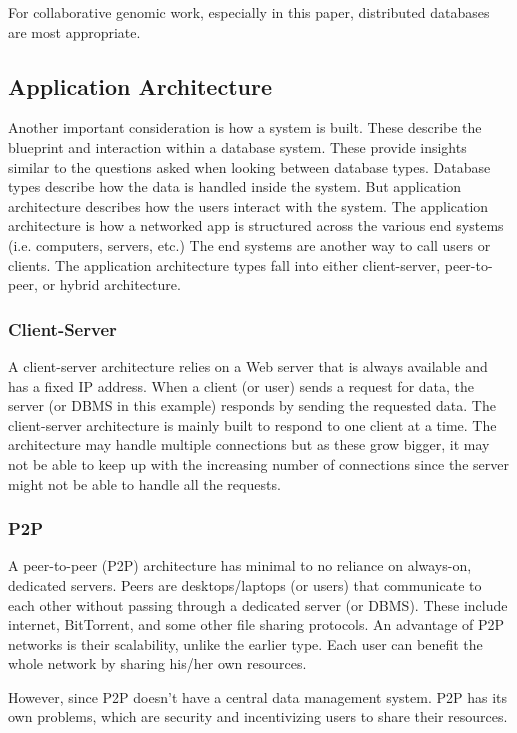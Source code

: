 \documentclass{article}
\begin{document}
For collaborative genomic work, especially in this paper, distributed databases are most appropriate.

\subsection{Application Architecture}
Another important consideration is how a system is built. These describe the blueprint and interaction within a database system. These provide insights similar to the questions asked when looking between database types. Database types describe how the data is handled inside the system. But application architecture describes how the users interact with the system. The application architecture is how a networked app is structured across the various end systems (i.e. computers, servers, etc.) \autocite{kurose} The end systems are another way to call users or clients. 
The application architecture types fall into either client-server, peer-to-peer, or hybrid architecture.

\subsubsection{Client-Server}
A client-server architecture relies on a Web server that is always
available and has a fixed IP address. When a client (or user) sends a request for data, the server (or DBMS in this example) responds by sending the requested data. The client-server architecture is mainly built to respond to one client at a time. The architecture may handle multiple connections but as these grow bigger, it may not be able to keep up with the increasing number of connections since the server might not be able to handle all the requests.

\subsubsection{P2P}
A peer-to-peer (P2P) architecture has minimal to no reliance on
always-on, dedicated servers. Peers are desktops/laptops (or users) that communicate to each other without passing through a dedicated server (or DBMS). These include internet, BitTorrent, and some other file sharing protocols. An advantage of P2P networks is their scalability, unlike the earlier type. Each user can benefit the whole network by sharing his/her own resources. 

However, since P2P doesn't have a central data management system. P2P has its own problems, which are security and incentivizing users to share their resources.
\end{document}
